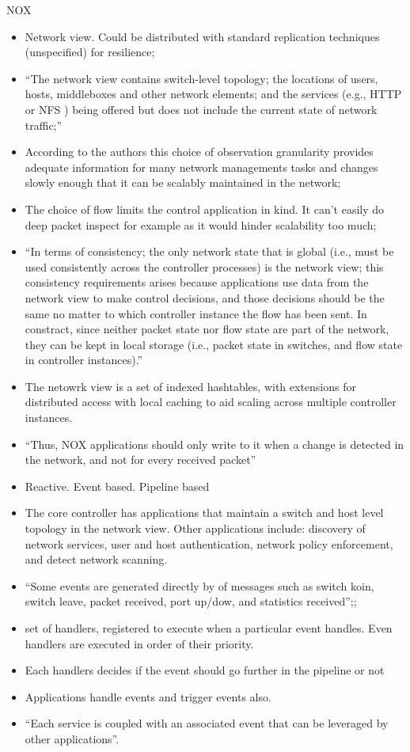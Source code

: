 \begin{itemize}
NOX
\begin{itemize}
\item Network view.  Could be distributed with standard replication techniques (unspecified) for resilience; 
\item ``The network view contains switch-level topology; the locations of users, hosts, middleboxes and other network elements; and the services (e.g., HTTP or NFS )  being offered but does not include the current state of network traffic;''
\item According to the authors this choice of observation granularity provides adequate information for many network managements tasks and changes slowly enough that it can be scalably maintained in the network; 
\item The choice of flow limits the control application in kind. It can't easily do deep packet inspect for example as it would hinder scalability too much; 
\item ``In terms of consistency; the only network state that is global (i.e., must be used consistently across the controller processes) is the network view; this consistency requirements arises because applications use data from the network view to make control decisions, and those decisions should be the same no matter to which controller instance the flow has been sent. In constract, since neither packet state nor flow state are part of the network, they can be kept in local storage (i.e., packet state in switches, and flow state in controller instances).'' 
\item The netowrk view is a set of indexed hashtables, with extensions for distributed access with local caching to aid scaling across multiple controller instances. 
\item ``Thus, NOX applications should only write to it when a change is detected in the network, and not for every received packet'' 

\item Reactive. Event based.   Pipeline based 
\item The core controller has applications that maintain a switch and host level topology in the network view. Other applications include: discovery of network services, user and host authentication, network policy enforcement, and detect network scanning. 
\item ``Some events are generated directly by \gls{of} messages such as switch koin, switch leave, packet received, port up/dow, and statistics received'';;
\item set of handlers, registered to execute when a particular event handles. Even handlers are executed in order of their priority.
\item Each handlers decides if the event should go further in the pipeline or not
\item Applications handle events and trigger events also. 
\item ``Each service is coupled with an associated event that can be leveraged by other applications''. 



\end{itemize}
\end{itemize}
